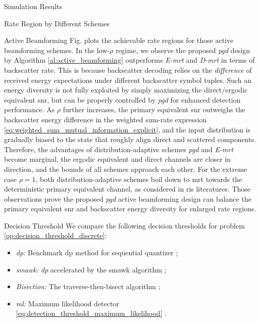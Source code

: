 \documentclass[journal]{IEEEtran}
\begin{document}
\begin{section}{Simulation Results}
\begin{subsection}{Rate Region by Different Schemes}
\begin{subsubsection}{Active Beamforming}
			Fig.  plots the achievable rate regions for those active beamforming schemes.
			In the low-$\rho$ regime, we observe the proposed \emph{\gls{pgd}} design by Algorithm \ref{al:active_beamforming} outperforms \emph{E-\gls{mrt}} and \emph{D-\gls{mrt}} in terms of backscatter rate.
			This is because backscatter decoding relies on the \emph{difference} of received energy expectations under different backscatter symbol tuples.
			Such an energy diversity is not fully exploited by simply maximizing the direct/ergodic equivalent \gls{snr}, but can be properly controlled by \emph{\gls{pgd}} for enhanced detection performance.
			As $\rho$ further increases, the primary equivalent \gls{snr} outweighs the backscatter energy difference in the weighted sum-rate expression \eqref{eq:weighted_sum_mutual_information_explicit}, and the input distribution is gradually biased to the state that roughly align direct and scattered components.
			Therefore, the advantages of distribution-adaptive schemes \emph{\gls{pgd}} and \emph{E-\gls{mrt}} become marginal, the ergodic equivalent and direct channels are closer in direction, and the bounds of all schemes approach each other.
			For the extreme case $\rho=1$, both distribution-adaptive schemes boil down to \gls{mrt} towards the deterministic primary equivalent channel, as considered in \gls{ris} literatures.
			Those observations prove the proposed \emph{\gls{pgd}} active beamforming design can balance the primary equivalent \gls{snr} and backscatter energy diversity for enlarged rate regions.
		\end{subsubsection}

		\begin{subsubsection}{Decision Threshold}
			We compare the following decision thresholds for problem \eqref{op:decision_threshold_discrete}:
			\begin{itemize}
				\item \emph{\gls{dp}:} Benchmark \gls{dp} method for sequential quantizer \cite{He2021};
				\item \emph{\gls{smawk}:} \emph{\gls{dp}} accelerated by the \gls{smawk} algorithm \cite{He2021};
				\item \emph{Bisection:} The traverse-then-bisect algorithm \cite{Nguyen2020a};
				\item \emph{\gls{ml}:} Maximum likelihood detector \eqref{eq:detection_threshold_maximum_likelihood} \cite{Qian2019}.
			\end{itemize}


\end{subsubsection}
\end{subsection}
\end{section}
\end{document}
